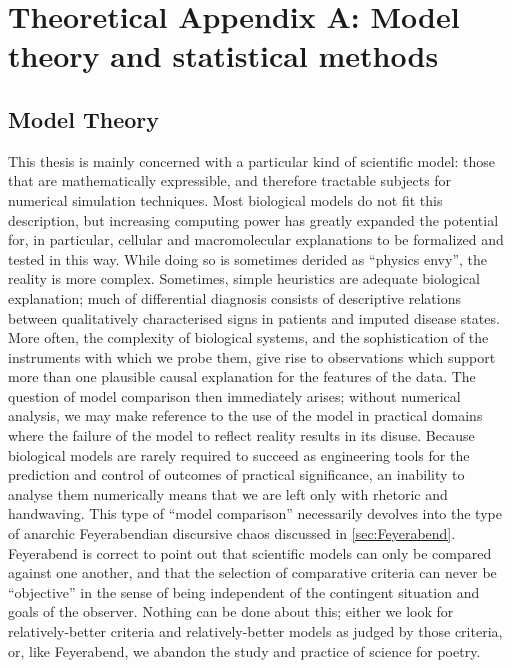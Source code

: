 \chapter{Theoretical Appendix A: Model theory and statistical methods}

\section{Model Theory}
This thesis is mainly concerned with a particular kind of scientific model: those that are mathematically expressible, and therefore tractable subjects for numerical simulation techniques. Most biological models do not fit this description, but increasing computing power has greatly expanded the potential for, in particular, cellular and macromolecular explanations to be formalized and tested in this way. While doing so is sometimes derided as ``physics envy'', the reality is more complex. Sometimes, simple heuristics are adequate biological explanation; much of differential diagnosis consists of descriptive relations between qualitatively characterised signs in patients and imputed disease states. More often, the complexity of biological systems, and the sophistication of the instruments with which we probe them, give rise to observations which support more than one plausible causal explanation for the features of the data. The question of model comparison then immediately arises; without numerical analysis, we may make reference to the use of the model in practical domains where the failure of the model to reflect reality results in its disuse. Because biological models are rarely required to succeed as engineering tools for the prediction and control of outcomes of practical significance, an inability to analyse them numerically means that we are left only with rhetoric and handwaving. This type of ``model comparison'' necessarily devolves into the type of anarchic Feyerabendian discursive chaos discussed in \autoref{sec:Feyerabend}. Feyerabend is correct to point out that scientific models can only be compared against one another, and that the selection of comparative criteria can never be ``objective'' in the sense of being independent of the contingent situation and goals of the observer. Nothing can be done about this; either we look for relatively-better criteria and relatively-better models as judged by those criteria, or, like Feyerabend, we abandon the study and practice of science for poetry.

